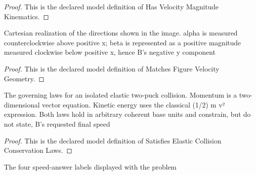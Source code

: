 \begin{proof}
  This is the declared model definition of Has Velocity Magnitude Kinematics.
\end{proof}
\begin{definition}
  \label{def:physics:phyx-mini-0816:phyxminiproblems-problemphyxmini0816-matchesfigurevelocitygeometry}
  Cartesian realization of the directions shown in the image. alpha is measured counterclockwise above positive x; beta is represented as a positive magnitude measured clockwise below positive x, hence B's negative y component
\end{definition}
\begin{proof}
  This is the declared model definition of Matches Figure Velocity Geometry.
\end{proof}
\begin{definition}
  \label{def:physics:phyx-mini-0816:phyxminiproblems-problemphyxmini0816-satisfieselasticcollisionconservationlaws}
  The governing laws for an isolated elastic two-puck collision. Momentum is a two-dimensional vector equation. Kinetic energy uses the classical (1/2) m v² expression. Both laws hold in arbitrary coherent base units and constrain, but do not state, B's requested final speed
\end{definition}
\begin{proof}
  This is the declared model definition of Satisfies Elastic Collision Conservation Laws.
\end{proof}
\begin{definition}
  \label{def:physics:phyx-mini-0816:phyxminiproblems-problemphyxmini0816-answerchoice}
  The four speed-answer labels displayed with the problem
\end{definition}
